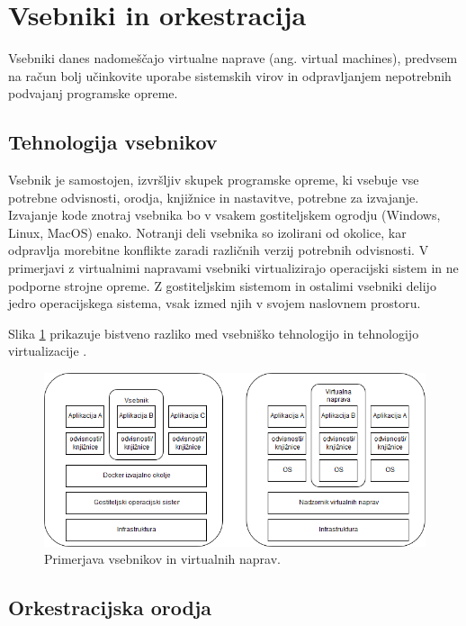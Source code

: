 \documentclass[a4paper, 12pt]{book}
\begin{document}
\section{Vsebniki in orkestracija}

Vsebniki danes nadomeščajo virtualne naprave (ang. virtual machines), predvsem na račun bolj učinkovite uporabe sistemskih virov in odpravljanjem ne\-po\-tre\-bnih podvajanj programske opreme.

\subsection{Tehnologija vsebnikov}
Vsebnik je samostojen, izvršljiv skupek programske opreme, ki vsebuje vse potrebne odvisnosti, orodja, knjižnice in nastavitve, potrebne za izvajanje.
Izvajanje kode znotraj vsebnika bo v vsakem gostiteljskem ogrodju (Windows, Linux, MacOS) enako.
Notranji deli vsebnika so izolirani od okolice, kar odpravlja morebitne konflikte zaradi različnih verzij potrebnih odvisnosti.
V primerjavi z virtualnimi napravami vsebniki virtualizirajo operacijski sistem in ne podporne strojne opreme.
Z gostiteljskim sistemom in ostalimi vsebniki delijo jedro operacijskega sistema, vsak izmed njih v svojem naslovnem prostoru.

Slika \ref{vm_vs_container} prikazuje bistveno razliko med vsebniško tehnologijo in tehnologijo virtualizacije \cite{dockerContainer}.

\begin{figure}[h]
	\includegraphics[width=1.0\textwidth]{slike/vsebniki_vm.png}
	\caption{Primerjava vsebnikov in virtualnih naprav.}
	\label{vm_vs_container}
\end{figure}


\subsection{Orkestracijska orodja}
\end{document}
